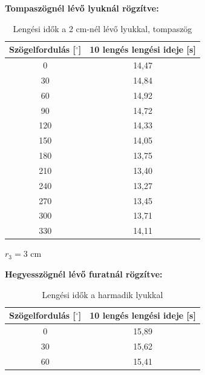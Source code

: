 \documentclass{article}
\begin{document}
\vspace{0.5em}
\noindent
\textbf{Tompaszögnél lévő lyuknál rögzítve:}
\begin{table}[H]
    \centering
    \begin{tabular}{|c|c|}
        \hline
        Szögelfordulás [$^\circ$] & 10 lengés lengési ideje [s] \\ \hline
        0                         & 14,47                       \\ \hline 
        30                        & 14,84                       \\ \hline
        60                        & 14,92                       \\ \hline 
        90                        & 14,72                       \\ \hline
        120                       & 14,33                       \\ \hline 
        150                       & 14,05                       \\ \hline
        180                       & 13,75                       \\ \hline
        210                       & 13,40                       \\ \hline
        240                       & 13,27                       \\ \hline
        270                       & 13,45                       \\ \hline
        300                       & 13,71                       \\ \hline
        330                       & 14,11                       \\ \hline
    \end{tabular}
    \caption{Lengési idők a 2 cm-nél lévő lyukkal, tompaszög}
    \label{tab:lengesiido_2.2}
\end{table}

\vspace{1em}
\noindent
$r_{3} = 3 \text{ cm}$

\vspace{0.5em}
\noindent
\textbf{Hegyesszögnél lévő furatnál rögzítve:}
\begin{table}[H]
    \centering
    \begin{tabular}{|c|c|}
        \hline
        Szögelfordulás [$^\circ$] & 10 lengés lengési ideje [s] \\ \hline
        0                         & 15,89                       \\ \hline 
        30                        & 15,62                       \\ \hline
        60                        & 15,41                       \\ \hline 
    \end{tabular}
    \caption{Lengési idők a harmadik lyukkal}
    \label{tab:lengesiido_3.1}
\end{table}
\end{document}
